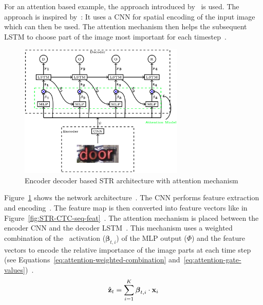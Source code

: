 For an attention based example, the approach introduced by~\cite{ghosh_visual_2017} is used.
The approach is inspired by~\cite{bahdanau_neural_2016,xu_show_2016}: It uses a \ac{CNN} for
spatial encoding of the input image which can then be used.
The attention mechanism then helps the subsequent \ac{LSTM} to choose part of the image most
important for each timestep~\citep{ghosh_visual_2017}.
\begin{figure}[h]
    \centering
    \includegraphics[width=0.7\textwidth]{img/STR-encdec-attention-Gosh-Visual-2017.png}
    \caption[Encoder decoder \& attention based STR architecture]{%
        Encoder decoder based STR architecture with attention
        mechanism~\citep{ghosh_visual_2017}\label{fig:STR-attention}
    }
\end{figure}
Figure~\ref{fig:STR-attention} shows the network architecture~\citep{ghosh_visual_2017}.
The \ac{CNN} performs feature extraction and encoding~\citep{ghosh_visual_2017}.
The feature map is then converted into feature vectors like in
Figure~\ref{fig:STR-CTC-seq-feat}~\citep{ghosh_visual_2017,shi_end--end_2017}.
The attention mechanism is placed between the encoder \ac{CNN} and the decoder
\ac{LSTM}~\citep{ghosh_visual_2017}.
This mechanism uses a weighted combination of the \sfmx\ activation ($\boldsymbol{\beta}_{t,i}$) of
the \ac{MLP} output ($\Phi$) and the feature vectors to encode the relative importance of the
image parts at each time step (see Equations~\ref{eq:attention-weighted-combination}
and~\ref{eq:attention-gate-values})~\citep{ghosh_visual_2017,xu_show_2016}.
\begin{equation}\label{eq:attention-weighted-combination}
    \hat{\textbf{z}}_t=\sum_{i=1}^{K}\boldsymbol{\beta}_{t,i}\cdot \textbf{x}_i
\end{equation}
